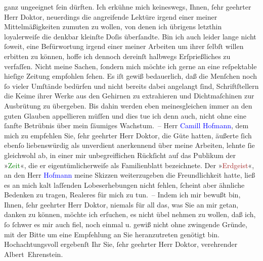                     ganz ungeeignet ſein dürften. Ich erkühne mich keineswegs, Ihnen, ſehr geehrter
                    Herr Doktor, neuerdings die angreifende Lektüre irgend einer meiner
                    Mittelmäßigkeiten zumuten zu wollen, von denen ich übrigens letzthin
                    loyalerweiſe die denkbar kleinſte Doſis überſandte. Bin ich auch leider lange
                    nicht ſoweit, eine Befürwortung irgend einer meiner Arbeiten um ihrer ſelbſt
                    willen erbitten zu können, hoffe ich dennoch dereinſt halbwegs Erſprießliches zu
                    verfaſſen. Nicht meine Sachen, {\pb}ſondern mich möchte ich
                    gerne an eine reſpektable hieſige Zeitung empfohlen ſehen. Es iſt gewiß
                    bedauerlich, daß die Menſchen noch ſo vieler Umſtände bedürfen und nicht bereits
                    dabei angelangt ſind, Schriftſtellern die Keime ihrer Werke aus den Gehirnen zu
                    extrahieren und Dichtmaſchinen zur Ausbrütung zu übergeben. Bis dahin werden
                    eben meinesgleichen immer an den guten Glauben appellieren müſſen und dies tue
                    ich denn auch, nicht ohne eine ſanfte Betrübnis über mein ſäumiges Wachstum. –
                    Herr \textcolor{blue}{Camill Hofmann}{}\ledrightnote{\textcolor{blue}{Camill Hoffmann}}, dem mich zu empfehlen
                    Sie, ſehr geehrter Herr Doktor, die Güte hatten, äußerte ſich ebenſo
                    liebenswürdig als unverdient anerkennend über meine Arbeiten, lehnte ſie
                    gleichwohl ab, in einer {\pb}mir unbegreiflichen Rückſicht
                    auf das Publikum der »\textcolor{green}{Zeit}{}\ledrightnote{\textcolor{green}{Die Zeit}}«, die er
                    eigentümlicherweiſe als Familienblatt bezeichnete. Der »\textcolor{brown}{Erdgeist}{}\ledrightnote{\textcolor{brown}{Erdgeist}}«, an den Herr \textcolor{blue}{Hofmann}{}\ledrightnote{\textcolor{blue}{Camill Hoffmann}} meine Skizzen weiterzugeben die Freundlichkeit hatte, ließ es
                    an mich kalt laſſenden Lobeserhebungen nicht fehlen, ſcheint aber ähnliche
                    Bedenken zu tragen, Realeres für mich zu tun. – Indem ich mir bewußt bin, Ihnen,
                    ſehr geehrter Herr Doktor, niemals für all das, was Sie an mir getan, danken zu
                    können, möchte ich erſuchen, es nicht übel nehmen zu wollen, daß ich, ſo ſchwer
                    es mir auch fiel, noch einmal u. gewiß nicht ohne zwingende Gründe, mit der
                    Bitte um eine Empfehlung an Sie heranzutreten genötigt bin. Hochachtungsvoll
                    ergebenſt Ihr Sie, ſehr geehrter Herr Doktor, verehrender\pend
           \pstart \spacefill\mbox{Albert Ehrenstein.}\pend{}\endnumbering{}  
      